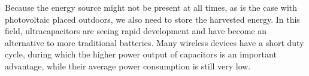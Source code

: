 \documentclass[a4paper,10pt]{article}
\begin{document}
Because the energy source might not be present at all times, as is the case with photovoltaic placed outdoors, we also need to store the harvested energy. In this field, ultracapacitors are seeing rapid development and have become an alternative to more traditional batteries. Many wireless devices have a short duty cycle, during which the higher power output of capacitors is an important advantage, while their average power consumption is still very low. 

\newpage


 
\end{document}

